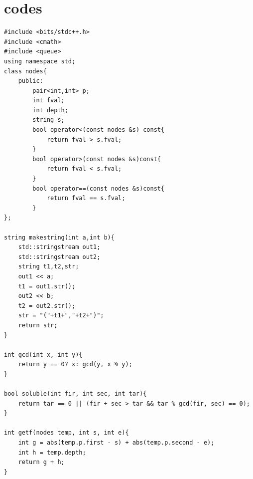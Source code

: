 \documentclass[a4paper, 11pt]{article}
\begin{document}
\section{codes}
\lstset{language=C++}
\lstset{breaklines=true}
\begin{lstlisting}
#include <bits/stdc++.h>
#include <cmath>
#include <queue>
using namespace std;
class nodes{
	public: 
		pair<int,int> p;
		int fval;
		int depth;
		string s;
		bool operator<(const nodes &s) const{
			return fval > s.fval;
		}
		bool operator>(const nodes &s)const{
			return fval < s.fval;
		}
		bool operator==(const nodes &s)const{
			return fval == s.fval;
		}
};

string makestring(int a,int b){
	std::stringstream out1;
	std::stringstream out2;
	string t1,t2,str;
    out1 << a;
    t1 = out1.str();
    out2 << b;
    t2 = out2.str();
    str = "("+t1+","+t2+")";
    return str;
}

int gcd(int x, int y){
	return y == 0? x: gcd(y, x % y);
}

bool soluble(int fir, int sec, int tar){
	return tar == 0 || (fir + sec > tar && tar % gcd(fir, sec) == 0);
}

int getf(nodes temp, int s, int e){
	int g = abs(temp.p.first - s) + abs(temp.p.second - e);
	int h = temp.depth;
	return g + h;
}


\end{lstlisting}
\end{document}
